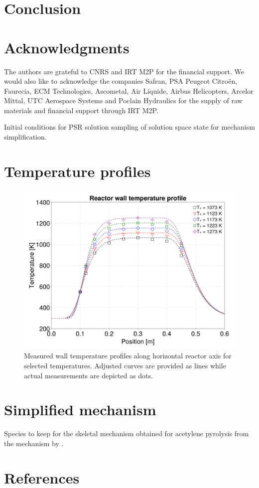 \documentclass[final,3p,times,twocolumn,sort&compress]{elsarticle}
\begin{document}
\section{Conclusion}

\section*{Acknowledgments}

The authors are grateful to CNRS and IRT M2P for the financial support. We would also like to acknowledge the companies Safran, PSA Peugeot Citroën, Faurecia, ECM Technologies, Ascometal, Air Liquide, Airbus Helicopters, Arcelor Mittal, UTC Aerospace Systems and Poclain Hydraulics for the supply of raw materials and financial support through IRT M2P.

\begin{table}
	\caption{\label{tab-sampling-conditions}Initial conditions for PSR solution sampling of solution space state for mechanism simplification.}
\end{table}

\appendix
\section{Temperature profiles}
\begin{figure}
	\centering
	\includegraphics[width=\linewidth]{wall-temperature}
	\caption{\label{fig:temperature-profile}Measured wall temperature profiles along horizontal reactor axis for selected temperatures. Adjusted curves are provided as lines while actual measurements are depicted as dots.}
\end{figure}

\section{Simplified mechanism}

\begin{table}
	\caption{\label{tab-species-to-kep}Species to keep for the skeletal mechanism obtained for acetylene pyrolysis from the mechanism by \citet{Norinaga2009}.}
\end{table}


\section*{References}

\end{document}
